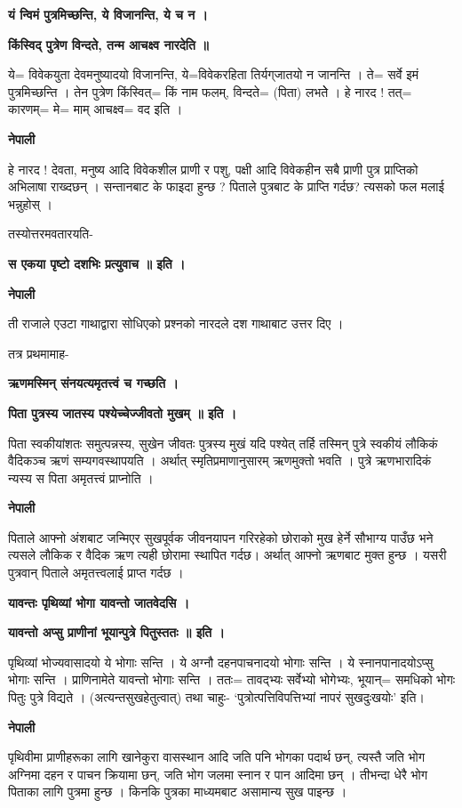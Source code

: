 \documentclass[11pt, a5paper]{article}
\begin{document}
\textbf{यं न्विमं पुत्रमिच्छन्ति, ये विजानन्ति, ये च न ।}

\textbf{किंस्विद् पुत्रेण विन्दते, तन्म आचक्ष्व नारदेति ॥}

ये= विवेकयुता देवमनुष्यादयो विजानन्ति, ये=विवेकरहिता तिर्यग्‌जातयो न जानन्ति । ते= सर्वे इमं पुत्रमिच्छन्ति । तेन पुत्रेण किंस्वित्= किं नाम फलम्, विन्दते=  (पिता) लभतेे । हे नारद ! तत्= कारणम्= मे= माम् आचक्ष्व= वद इति ।

\textbf{नेपाली}

हे नारद ! देवता, मनुष्य आदि विवेकशील प्राणी र पशु, पक्षी आदि विवेकहीन सबै प्राणी पुत्र प्राप्तिको अभिलाषा राख्दछन् । सन्तानबाट के फाइदा हुन्छ ? पिताले पुत्रबाट के प्राप्ति गर्दछ? त्यसको फल मलाई भन्नुहोस् ।

तस्योत्तरमवतारयति-

\textbf{स एकया पृष्टो दशभिः प्रत्युवाच ॥ इति ।}

\textbf{नेपाली}

ती राजाले एउटा गाथाद्वारा सोधिएको प्रश्नको नारदले दश गाथाबाट उत्तर दिए ।

तत्र प्रथमामाह-

\textbf{ऋणमस्मिन् संनयत्यमृतत्त्वं च गच्छति ।}

\textbf{पिता पुत्रस्य जातस्य पश्येच्चेज्जीवतो मुखम् ॥ इति ।}

पिता स्वकीयांशतः समुत्पन्नस्य, सुखेन जीवतः पुत्रस्य मुखं यदि पश्येत् तर्हि तस्मिन् पुत्रे स्वकीयं लौकिकं वैदिकञ्च ऋणं सम्यगवस्थापयति । अर्थात् स्मृतिप्रमाणानुसारम् ऋणमुक्तो भवति । पुत्रे ऋणभारादिकं न्यस्य स पिता अमृतत्त्वं प्राप्नोति ।

\textbf{नेपाली}

पिताले आफ्नो अंशबाट जन्मिएर सुखपूर्वक जीवनयापन गरिरहेको छोराको मुख हेर्ने सौभाग्य पाउँछ भने त्यसले लौकिक र वैदिक ऋण त्यही छोरामा स्थापित गर्दछ। अर्थात् आफ्नो ऋणबाट मुक्त हुन्छ । यसरी पुत्रवान् पिताले अमृतत्त्वलाई प्राप्त गर्दछ ।

\textbf{यावन्तः पृथिव्यां भोगा यावन्तो जातवेदसि ।}

\textbf{यावन्तो अप्सु प्राणीनां भूयान्पुत्रे पितुस्ततः ॥ इति ।}

पृथिव्यां भोज्यवासादयो ये भोगाः सन्ति । ये अग्नौ दहनपाचनादयो भोगाः सन्ति । ये स्नानपानादयोऽप्सु भोगाः सन्ति । प्राणिनामेते यावन्तो भोगाः सन्ति । ततः= तावद्भ्यः सर्वेभ्यो भोगेभ्यः, भूयान्‌‍‍‍= समधिको भोगः पितुः पुत्रे विद्यते । (अत्यन्तसुखहेतुत्वात्) तथा चाहुः- ‘पुत्रोत्पत्तिविपत्तिभ्यां नापरं सुखदुःखयोः’ इति।

\textbf{नेपाली}

पृथिवीमा प्राणीहरूका लागि खानेकुरा वासस्थान आदि जति पनि भोगका पदार्थ छन्, त्यस्तै जति भोग अग्निमा दहन र पाचन क्रियामा छन्, जति भोग जलमा स्नान र पान आदिमा छन् । तीभन्दा धेरै भोग पिताका लागि पुत्रमा हुन्छ । किनकि पुत्रका माध्यमबाट असामान्य सुख पाइन्छ ।
\end{document}
